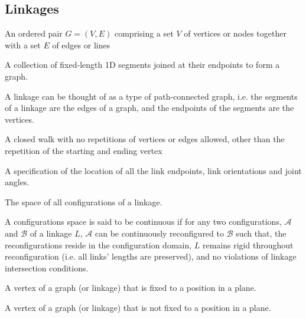 \subsection{Linkages}
\begin{definition}[Graph]\label{def:linkages-2}
An ordered pair $G = (V, E)$ comprising a set $V$ of vertices or nodes together with a set $E$ of edges or lines
\end{definition} 
\begin{definition}[Linkage]\label{def:linkages-1}
A collection of fixed-length 1D segments joined at their endpoints to form a graph.
\end{definition} 
A linkage can be thought of as a type of path-connected graph, i.e. the segments of a linkage are the edges of a graph, and the endpoints of the segments are the vertices.
\begin{definition}[Cycle]\label{def:linkages-3}
 A closed walk with no repetitions of vertices or edges allowed, other than the repetition of the starting and ending vertex
\end{definition} 
\begin{definition}[Configuration]\label{def:linkages-6}
A specification of the location of all the link endpoints, link orientations and
joint angles.\cite{demaine2008geometric}
\end{definition}
\begin{definition}\label{def:linkages-7}
The space of all configurations of a linkage.
\end{definition} 
A configurations space is said to be continuous if for any two configurations, $\mathcal{A}$ and $\mathcal{B}$ of a linkage $L$, $\mathcal{A}$ can be continuously reconfigured to $\mathcal{B}$ such that, the reconfigurations reside in the configuration domain, $L$ remains rigid throughout reconfiguration (i.e. all links' lengths are preserved), and no violations of linkage intersection conditions. 
\begin{definition}\label{def:linkages-8}
A vertex of a graph (or linkage) that is fixed to a position in a plane.
\end{definition} 
\begin{definition}\label{def:linkages-8}
A vertex of a graph (or linkage) that is not fixed to a position in a plane.
\end{definition} 
